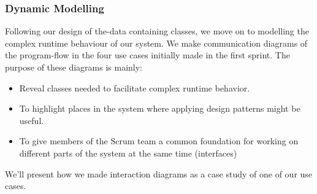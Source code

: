 \subsubsection{Dynamic Modelling}
Following our design of the-data containing classes, we move on to modelling the complex runtime behaviour of our system. We make communication diagrams of the program-flow in the four use cases initially made in the first sprint. The purpose of these diagrams is mainly:
\begin{itemize}
\item Reveal classes needed to facilitate complex runtime behavior. 
\item To highlight places in the system where applying design patterns might be useful.
\item To give members of the Scrum team a common foundation for working on different parts of the system at the same time (interfaces)
\end{itemize}
We'll present how we made interaction diagrams as a case study of one of our use cases.

